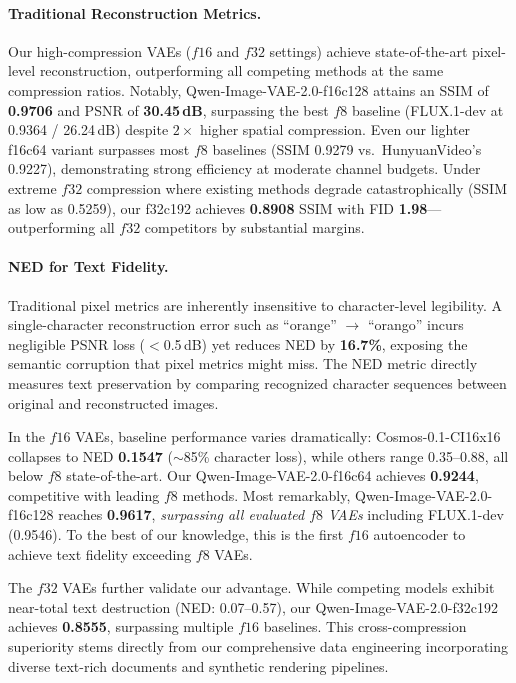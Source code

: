 \paragraph{Traditional Reconstruction Metrics.}
Our high-compression VAEs ($f16$ and $f32$ settings) achieve state-of-the-art pixel-level reconstruction, outperforming all competing methods at the same compression ratios. Notably, Qwen-Image-VAE-2.0-f16c128 attains an SSIM of \textbf{0.9706} and PSNR of \textbf{30.45\,dB}, surpassing the best $f8$ baseline (FLUX.1-dev at 0.9364 / 26.24\,dB) despite $2\times$ higher spatial compression. Even our lighter f16c64 variant surpasses most $f8$ baselines (SSIM 0.9279 vs.\ HunyuanVideo's 0.9227), demonstrating strong efficiency at moderate channel budgets. Under extreme $f32$ compression where existing methods degrade catastrophically (SSIM as low as 0.5259), our f32c192 achieves \textbf{0.8908} SSIM with FID \textbf{1.98}---outperforming all $f32$ competitors by substantial margins.

\paragraph{NED for Text Fidelity.}
Traditional pixel metrics are inherently insensitive to character-level legibility. A single-character reconstruction error such as ``orange'' $\to$ ``orango'' incurs negligible PSNR loss ($<$0.5\,dB) yet reduces NED by \textbf{16.7\%}, exposing the semantic corruption that pixel metrics might miss. The NED metric directly measures text preservation by comparing recognized character sequences between original and reconstructed images.

In the $f16$ VAEs, baseline performance varies dramatically: Cosmos-0.1-CI16x16 collapses to NED \textbf{0.1547} (${\sim}$85\% character loss), while others range 0.35--0.88, all below $f8$ state-of-the-art. Our Qwen-Image-VAE-2.0-f16c64 achieves \textbf{0.9244}, competitive with leading $f8$ methods. Most remarkably, Qwen-Image-VAE-2.0-f16c128 reaches \textbf{0.9617}, \emph{surpassing all evaluated $f8$ VAEs} including FLUX.1-dev (0.9546). To the best of our knowledge, this is the first $f16$ autoencoder to achieve text fidelity exceeding $f8$ VAEs.

The $f32$ VAEs further validate our advantage. While competing models exhibit near-total text destruction (NED: 0.07--0.57), our Qwen-Image-VAE-2.0-f32c192 achieves \textbf{0.8555}, surpassing multiple $f16$ baselines. This cross-compression superiority stems directly from our comprehensive data engineering incorporating diverse text-rich documents and synthetic rendering pipelines.

